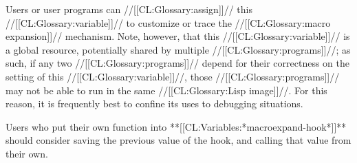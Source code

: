 Users or user programs can //[[CL:Glossary:assign]]// this //[[CL:Glossary:variable]]// to customize or trace the //[[CL:Glossary:macro expansion]]// mechanism. Note, however, that this //[[CL:Glossary:variable]]// is a global resource, potentially shared by multiple //[[CL:Glossary:programs]]//; as such, if any two //[[CL:Glossary:programs]]// depend for their correctness on the setting of this //[[CL:Glossary:variable]]//, those //[[CL:Glossary:programs]]// may not be able to run in the same //[[CL:Glossary:Lisp image]]//. For this reason, it is frequently best to confine its uses to debugging situations.

Users who put their own function into **[[CL:Variables:*macroexpand-hook*]]** should consider saving the previous value of the hook, and calling that value from their own.

    
